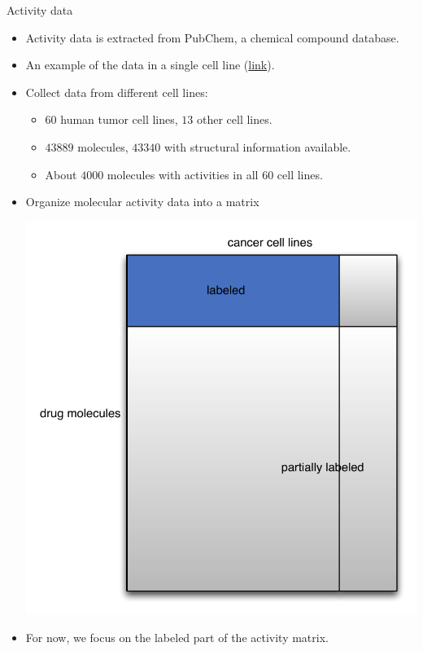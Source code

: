 \documentclass[first=dgreen,second=purple,logo=yellowexc]{aaltoslides}
\begin{document}
{\begin{frame}{Activity data}
	\begin{itemize}
		\item Activity data is extracted from PubChem, a chemical compound database.
		\item An example of the data in a single cell line (\href{https://www.ncbi.nlm.nih.gov/pcassay?term=\%22DTP\%2FNCI\%22}{link}).
		\item Collect data from different cell lines:
		\begin{itemize}
			\footnotesize
			\item $60$ human tumor cell lines, $13$ other cell lines.
			\item $43889$ molecules, $43340$ with structural information available.
			\item About $4000$ molecules with activities in all $60$ cell lines.
		\end{itemize}
		\item Organize molecular activity data into a matrix
		\begin{center}
			\includegraphics[scale=0.25]{./figures/datamatrix.pdf}
		\end{center}
		\item For now, we focus on the labeled part of the activity matrix.
	\end{itemize}
\end{frame}





}
\end{document}
